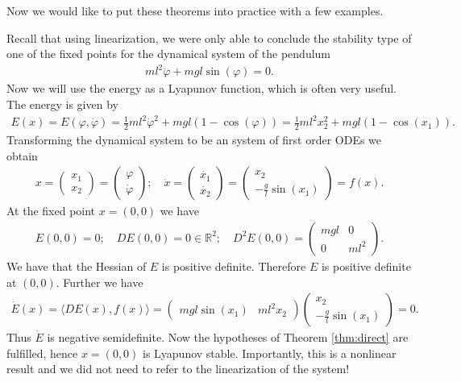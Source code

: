 Now we would like to put these theorems into practice with a few examples.
\begin{ex}
	Recall that using linearization, we were only able to conclude the stability type of one of the fixed points for the dynamical system of the pendulum
	\begin{align}
		ml^2 \ddot{\varphi} + mgl \sin(\varphi) =0.
	\end{align}
Now we will use the energy as a Lyapunov function, which is often very useful. The energy is given by
\begin{align}
	E(x) = E(\varphi, \dot{\varphi}) = \frac{1}{2}ml^2 \dot{\varphi}^2 + mgl(1-\cos(\varphi)) 
	= \frac{1}{2}ml^2 x_2^2 + mgl(1-\cos(x_1)).
\end{align}
Transforming the dynamical system to be an system of first order ODEs we obtain
\begin{align}
	x = 
	\begin{pmatrix}
		x_1 \\x_2
	\end{pmatrix}
	=
	\begin{pmatrix}
		\varphi \\ \dot{\varphi}
	\end{pmatrix}
	;\quad \dot{x}=
	\begin{pmatrix}
		\dot{x_1} \\ \dot{x_2}
	\end{pmatrix}
	=
	\begin{pmatrix}
		x_2 \\ - \frac{g}{l} \sin (x_1)
	\end{pmatrix}
	=f(x).
\end{align}
At the fixed point $x=(0,0)$ we have
\begin{align}
	E(0,0) = 0;\quad DE(0,0) = 0\in \mathbb{R}^{2};\quad D^2E(0,0) =
\begin{pmatrix}
	mgl & 0 \\
	0 & ml^2
\end{pmatrix}.
\end{align}
We have that the Hessian of $E$ is positive definite. Therefore $E$ is positive definite at $(0,0)$. Further we have
\begin{align}
	\dot{E}(x) = \langle DE(x), f(x) \rangle 
	=
	\begin{pmatrix}
		mgl \sin(x_1) &  ml^2 x_2
	\end{pmatrix}
	\begin{pmatrix}
		x_2 \\ - \frac{g}{l}\sin (x_1)			
	\end{pmatrix}
	= 0.	
\end{align}
Thus $\dot{E}$ is negative semidefinite. Now the hypotheses of Theorem \ref{thm:direct} are fulfilled, hence $x=(0,0)$ is Lyapunov stable. Importantly, this is a nonlinear result and we did not need to refer to the linearization of the system!


\end{ex}

